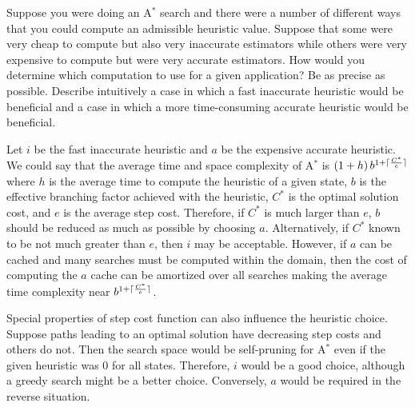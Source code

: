 \documentclass[12pt]{article}
\newenvironment{problem}[2][Problem]{\begin{trivlist}
\item[\hskip \labelsep {\bfseries #1}\hskip \labelsep {\bfseries #2.}]}{\end{trivlist}}
\DeclarePairedDelimiter{\ceil}{\lceil}{\rceil}
\begin{document}
\begin{problem}{2}
	Suppose you were doing an A$^*$ search and there were a number of different ways that you could compute an admissible heuristic value.
	Suppose that some were very cheap to compute but also very inaccurate estimators while others were very expensive to compute but were very accurate estimators.
	How would you determine which computation to use for a given application?
	Be as precise as possible.
	Describe intuitively a case in which a fast inaccurate heuristic would be beneficial and a case in which a more time-consuming accurate heuristic would be beneficial.

	\vspace{0.25cm}
	Let $i$ be the fast inaccurate heuristic and $a$ be the expensive accurate heuristic.
	We could say that the average time and space complexity of A$^*$ is $\left(1 + h\right)b^{1+\ceil{\frac{C^*}{e}}}$ where $h$ is the average time to compute the heuristic of a given state,
	$b$ is the effective branching factor achieved with the heuristic,	$C^*$ is the optimal solution cost, and $e$ is the average step cost.
	Therefore, if $C^*$ is much larger than $e$, $b$ should be reduced as much as possible by choosing $a$.
	Alternatively, if $C^*$ known to be not much greater than $e$, then $i$ may be acceptable.
	However, if $a$ can be cached and many searches must be computed within the domain, then the cost of computing the $a$ cache can be amortized over all searches making the average time complexity near $b^{1+\ceil{\frac{C^*}{e}}}$.

	Special properties of step cost function can also influence the heuristic choice.
	Suppose paths leading to an optimal solution have decreasing step costs and others do not.
	Then the search space would be self-pruning for A$^*$ even if the given heuristic was 0 for all states.
	Therefore, $i$ would be a good choice, although a greedy search might be a better choice.
	Conversely, $a$ would be required in the reverse situation.

\end{problem}
\end{document}

